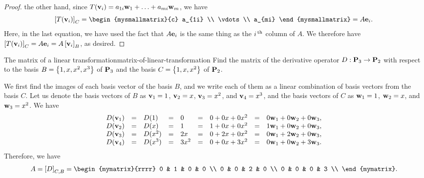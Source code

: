 \begin{proof}
  the other hand, since
  $T(\mbox{\bf v}_i) = a_{1i}\mbox{\bf w}_1 + \ldots + a_{mi}\mbox{\bf w}_m$,
  we have
  \begin{equation*}
    \coord{T(\vect{v}_i)}_C =
    \begin{mysmallmatrix}{c}
      a_{1i} \\ \vdots \\ a_{mi}
    \end{mysmallmatrix}
    = A\vect{e}_i.
  \end{equation*}
  Here, in the last equation, we have used the fact that $A\mbox{\bf e}_i$
  is the same thing as the $i^{\,\rm th}$ column of $A$. We therefore have
  $\left[T(\mbox{\bf v}_i)\right]_C = A\mbox{\bf e}_i = A \left[\mbox{\bf v}_i\right]_B$, as
  desired.
\end{proof}

\begin{example}{The matrix of a linear transformation}{matrix-of-linear-transformation}
  Find the matrix of the derivative operator $D:\mathbf{P}_3\to\mathbf{P}_2$
  with respect to the basis $B=\left\{1,x,x^2,x^3\right\}$ of $\mathbf{P}_3$ and the
  basis $C=\left\{1,x,x^2\right\}$ of $\mathbf{P}_2$.
\end{example}

\begin{solution}
  We first find the images of each basis vector of the basis $B$, and
  we write each of them as a linear combination of basis vectors from
  the basis $C$. Let us denote the basis vectors of $B$ as
  $\mbox{\bf v}_1 = 1$, $\mbox{\bf v}_2 = x$, $\mbox{\bf v}_3 = x^2$, and
  $\mbox{\bf v}_4=x^3$, and the basis vectors of $C$ as $\mbox{\bf w}_1 = 1$,
  $\mbox{\bf w}_2 = x$, and $\mbox{\bf w}_3 = x^2$. We have
  \begin{equation*}
    \begin{array}{rclclclcl}
      D(\mbox{\bf v}_1) &=& D(1) &=& 0 &=& 0 + 0x + 0x^2 &=& 0\mbox{\bf w}_1 + 0\mbox{\bf w}_2 + 0\mbox{\bf w}_3, \\
      D(\mbox{\bf v}_2) &=& D(x) &=& 1 &=& 1 + 0x + 0x^2 &=& 1\mbox{\bf w}_1 + 0\mbox{\bf w}_2 + 0\mbox{\bf w}_3, \\
      D(\mbox{\bf v}_3) &=& D(x^2) &=& 2x &=& 0 + 2x + 0x^2 &=& 0\mbox{\bf w}_1 + 2\mbox{\bf w}_2 + 0\mbox{\bf w}_3, \\
      D(\mbox{\bf v}_4) &=& D(x^3) &=& 3x^2 &=& 0 + 0x + 3x^2 &=& 0\mbox{\bf w}_1 + 0\mbox{\bf w}_2 + 3\mbox{\bf w}_3. \\
    \end{array}
  \end{equation*}
  Therefore, we have
  \begin{equation*}
    A=\coord{D}_{C,B} =
    \begin{mymatrix}{rrrr}
      0 & 1 & 0 & 0 \\
      0 & 0 & 2 & 0 \\
      0 & 0 & 0 & 3 \\
    \end{mymatrix}.
  \end{equation*}
\end{solution}

